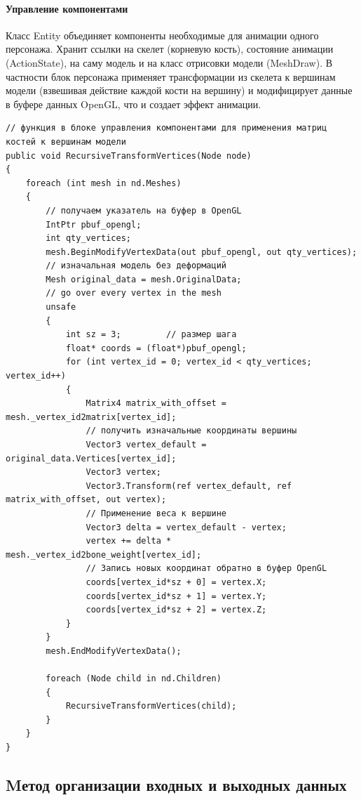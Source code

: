 \paragraph{Управление компонентами}
Класс Entity объединяет компоненты необходимые для анимации одного персонажа. Хранит ссылки на скелет (корневую кость), состояние анимации (ActionState), на саму модель и на класс отрисовки модели (MeshDraw).
    \medskip
    В частности блок персонажа применяет трансформации из скелета к вершинам модели (взвешивая действие каждой кости на вершину) и модифицирует данные в буфере данных OpenGL, что и создает эффект анимации.
    
\begin{verbatim}
// функция в блоке управления компонентами для применения матриц костей к вершинам модели
public void RecursiveTransformVertices(Node node)
{
    foreach (int mesh in nd.Meshes)
    {
        // получаем указатель на буфер в OpenGL
        IntPtr pbuf_opengl;
        int qty_vertices;
        mesh.BeginModifyVertexData(out pbuf_opengl, out qty_vertices);
        // изначальная модель без деформаций
        Mesh original_data = mesh.OriginalData;
        // go over every vertex in the mesh
        unsafe
        {
            int sz = 3;         // размер шага
            float* coords = (float*)pbuf_opengl;
            for (int vertex_id = 0; vertex_id < qty_vertices; vertex_id++)
            {
                Matrix4 matrix_with_offset = mesh._vertex_id2matrix[vertex_id];
                // получить изначальные координаты вершины
                Vector3 vertex_default = original_data.Vertices[vertex_id];
                Vector3 vertex;
                Vector3.Transform(ref vertex_default, ref matrix_with_offset, out vertex);
                // Применение веса к вершине
                Vector3 delta = vertex_default - vertex;
                vertex += delta *  mesh._vertex_id2bone_weight[vertex_id];
                // Запись новых координат обратно в буфер OpenGL
                coords[vertex_id*sz + 0] = vertex.X;
                coords[vertex_id*sz + 1] = vertex.Y;
                coords[vertex_id*sz + 2] = vertex.Z;
            }
        }
        mesh.EndModifyVertexData();

        foreach (Node child in nd.Children)
        {
            RecursiveTransformVertices(child);
        }
    }
}
\end{verbatim}


\subsection{Mетод организации входных и выходных данных}

